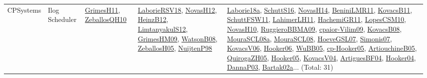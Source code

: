 {\begin{longtable}{lp{3cm}>{\raggedright}p{6cm}>{\raggedright}p{6cm}p{8cm}}
CPSystems & Ilog Scheduler & \href{papers/GrimesH11.pdf}{GrimesH11}\cite{GrimesH11}, \href{articles/ZeballosQH10.pdf}{ZeballosQH10}\cite{ZeballosQH10} & \href{articles/LaborieRSV18.pdf}{LaborieRSV18}\cite{LaborieRSV18}, \href{articles/NovasH12.pdf}{NovasH12}\cite{NovasH12}, \href{papers/HeinzB12.pdf}{HeinzB12}\cite{HeinzB12}, \href{articles/LimtanyakulS12.pdf}{LimtanyakulS12}\cite{LimtanyakulS12}, \href{papers/GrimesHM09.pdf}{GrimesHM09}\cite{GrimesHM09}, \href{papers/WatsonB08.pdf}{WatsonB08}\cite{WatsonB08}, \href{articles/ZeballosH05.pdf}{ZeballosH05}\cite{ZeballosH05}, \href{articles/NuijtenP98.pdf}{NuijtenP98}\cite{NuijtenP98} & \href{papers/Laborie18a.pdf}{Laborie18a}\cite{Laborie18a}, \href{papers/SchuttS16.pdf}{SchuttS16}\cite{SchuttS16}, \href{articles/NovasH14.pdf}{NovasH14}\cite{NovasH14}, \href{articles/BeniniLMR11.pdf}{BeniniLMR11}\cite{BeniniLMR11}, \href{articles/KovacsB11.pdf}{KovacsB11}\cite{KovacsB11}, \href{articles/SchuttFSW11.pdf}{SchuttFSW11}\cite{SchuttFSW11}, \href{papers/LahimerLH11.pdf}{LahimerLH11}\cite{LahimerLH11}, \href{articles/HachemiGR11.pdf}{HachemiGR11}\cite{HachemiGR11}, \href{articles/LopesCSM10.pdf}{LopesCSM10}\cite{LopesCSM10}, \href{articles/NovasH10.pdf}{NovasH10}\cite{NovasH10}, \href{articles/RuggieroBBMA09.pdf}{RuggieroBBMA09}\cite{RuggieroBBMA09}, \href{papers/cpaior-Vilim09.pdf}{cpaior-Vilim09}\cite{cpaior-Vilim09}, \href{articles/KovacsB08.pdf}{KovacsB08}\cite{KovacsB08}, \href{papers/MouraSCL08a.pdf}{MouraSCL08a}\cite{MouraSCL08a}, \href{papers/MouraSCL08.pdf}{MouraSCL08}\cite{MouraSCL08}, \href{papers/HoeveGSL07.pdf}{HoeveGSL07}\cite{HoeveGSL07}, \href{articles/Simonis07.pdf}{Simonis07}\cite{Simonis07}, \href{papers/KovacsV06.pdf}{KovacsV06}\cite{KovacsV06}, \href{articles/Hooker06.pdf}{Hooker06}\cite{Hooker06}, \href{papers/WuBB05.pdf}{WuBB05}\cite{WuBB05}, \href{papers/cp-Hooker05.pdf}{cp-Hooker05}\cite{cp-Hooker05}, \href{papers/ArtiouchineB05.pdf}{ArtiouchineB05}\cite{ArtiouchineB05}, \href{papers/QuirogaZH05.pdf}{QuirogaZH05}\cite{QuirogaZH05}, \href{articles/Hooker05.pdf}{Hooker05}\cite{Hooker05}, \href{papers/KovacsV04.pdf}{KovacsV04}\cite{KovacsV04}, \href{papers/ArtiguesBF04.pdf}{ArtiguesBF04}\cite{ArtiguesBF04}, \href{papers/Hooker04.pdf}{Hooker04}\cite{Hooker04}, \href{papers/DannaP03.pdf}{DannaP03}\cite{DannaP03}, \href{papers/Bartak02a.pdf}{Bartak02a}\cite{Bartak02a}... (Total: 31)\\

\end{longtable}}
